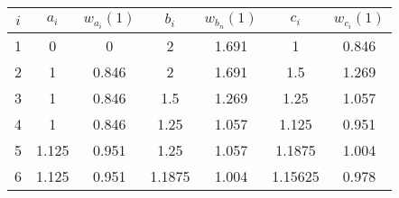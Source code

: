 \begin{enumerate}
\begin{enumerate}
		            \begin{tabular}{|c||c|c||c|c||c|c|}
			            \hline
			            $i$ & \hspace{20pt} $a_i$ \hspace{20pt} & \hspace{10pt} $w_{a_i}(1)$  \hspace{10pt} & $b_i$  \hspace{20pt} & \hspace{10pt} $w_{b_n}(1)$ \hspace{10pt} & \hspace{20pt} $c_i$  \hspace{20pt} & \hspace{10pt} $w_{c_i}(1)$ \hspace{10pt} \\ \hline
			            1   & 0                                 & 0                                         & 2                    & 1.691                                    & 1                                  & 0.846                                    \\[10pt]\hline
			            2   & 1                                 & 0.846                                     & 2                    & 1.691                                    & 1.5                                & 1.269                                    \\[10pt]\hline
			            3   & 1                                 & 0.846                                     & 1.5                  & 1.269                                    & 1.25                               & 1.057                                    \\[10pt]\hline
			            4   & 1                                 & 0.846                                     & 1.25                 & 1.057                                    & 1.125                              & 0.951                                    \\[10pt]\hline
			            5   & 1.125                             & 0.951                                     & 1.25                 & 1.057                                    & 1.1875                             & 1.004                                    \\[10pt]\hline
			            6   & 1.125                             & 0.951                                     & 1.1875               & 1.004                                    & 1.15625                            & 0.978                                    \\[10pt]\hline

\end{tabular}
\end{enumerate}
\end{enumerate}
